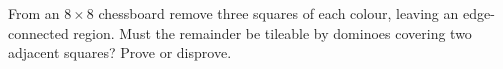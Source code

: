 From an $8\times8$ chessboard remove three squares of each colour, leaving an edge-connected region. Must the remainder be tileable by dominoes covering two adjacent squares? Prove or disprove.
